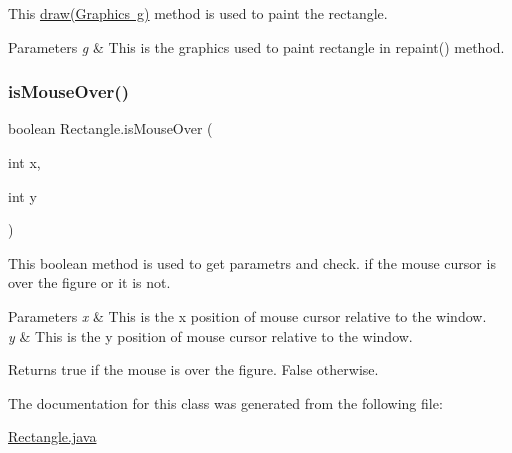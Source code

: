 This \mbox{\hyperlink{class_rectangle_ae4c3ecbd65d2e84b8a62add8687b73ad}{draw(\+Graphics g)}} method is used to paint the rectangle. 
\begin{DoxyParams}{Parameters}
{\em g} & This is the graphics used to paint rectangle in repaint() method. \\
\hline
\end{DoxyParams}
\mbox{\label{class_rectangle_a2dc2283bb83f83c589d14984116f098b}} 
\subsubsection{\texorpdfstring{isMouseOver()}{isMouseOver()}}
{\footnotesize\ttfamily boolean Rectangle.\+is\+Mouse\+Over (\begin{DoxyParamCaption}\item[{int}]{x,  }\item[{int}]{y }\end{DoxyParamCaption})}

This boolean method is used to get parametrs and check. if the mouse cursor is over the figure or it is not. 
\begin{DoxyParams}{Parameters}
{\em x} & This is the x position of mouse cursor relative to the window. \\
\hline
{\em y} & This is the y position of mouse cursor relative to the window. \\
\hline
\end{DoxyParams}
\begin{DoxyReturn}{Returns}
true if the mouse is over the figure. False otherwise. 
\end{DoxyReturn}


The documentation for this class was generated from the following file\+:\begin{DoxyCompactItemize}
\item 
\mbox{\hyperlink{_rectangle_8java}{Rectangle.\+java}}\end{DoxyCompactItemize}
